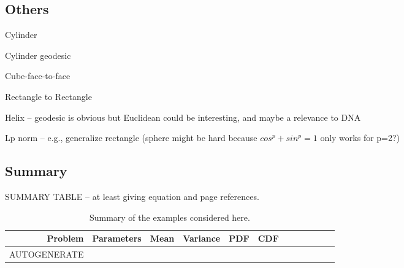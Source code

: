 \documentclass{article}
\begin{document}
\clearpage


\clearpage


\clearpage


\clearpage


\clearpage


\clearpage


\clearpage


\clearpage


\clearpage


\clearpage


\clearpage


\clearpage


\clearpage
\subsection{Others}

Cylinder

Cylinder geodesic

Cube-face-to-face

Rectangle to Rectangle

Helix -- geodesic is obvious but Euclidean could be interesting, and
maybe a relevance to DNA
 

Lp norm -- e.g., generalize rectangle (sphere might be hard because
$cos^p+sin^p=1$ only works for p=2?)



\clearpage
\subsection{Summary}
SUMMARY TABLE -- at least giving equation and page references.

\begin{table}[ht]
  \centering
  \begin{tabular}{r|lllllllllll}
    Problem & Parameters & Mean & Variance & PDF & CDF \\
    \hline
    AUTOGENERATE
  \end{tabular}
  \caption{Summary of the examples considered here.}
  \label{tab:summary}
\end{table}

\clearpage


\clearpage


\clearpage

\end{document}
